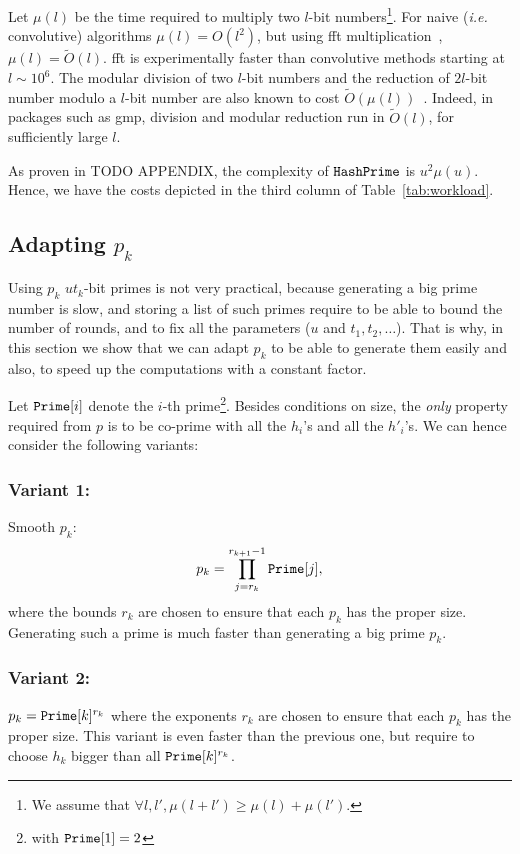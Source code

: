\documentclass[11pt]{llncs}
\newcommand{\Oapp}{\ensuremath{\tilde{O}}}
\begin{document}
Let $\mu(l)$ be the time required to multiply two $l$-bit numbers\footnote{We assume that $\forall l,l', \mu(l+l') \ge \mu(l) + \mu(l')$.}.
For naive ({\sl i.e.} convolutive) algorithms $\mu(l) = O(l^2)$, but using {\sc fft} multiplication~\cite{schonhage1971schnelle}, $\mu(l) = \Oapp(l)$. {\sc fft} is experimentally faster than convolutive methods starting at $l \sim 10^6$.
The modular division of two $l$-bit numbers and the reduction of $2l$-bit number modulo a $l$-bit number are also known to cost $\Oapp(\mu(l))$~\cite{burnikel1998fast}.
Indeed, in packages such as {\sf gmp}, division and modular reduction run in $\Oapp(l)$, for sufficiently large $l$.\smallskip

As proven in TODO APPENDIX, the complexity of $\tt HashPrime$ is $u^2 \mu(u)$.
Hence, we have the costs depicted in the third column of Table~\ref{tab:workload}.



\subsection{Adapting $p_k$}

Using $p_k$ $ut_k$-bit primes is not very practical, because generating a big prime number is slow, and storing a list of such primes require to be able to bound the number of rounds, and to fix all the parameters ($u$ and $t_1,t_2,\dots$).
That is why, in this section we show that we can adapt $p_k$ to be able to generate them easily and also, to speed up the computations with a constant factor.

Let $\mbox{{\tt Prime}}[i]$ denote the $i$-th prime\footnote{with $\mbox{{\tt Prime}}[1]=2$}. Besides conditions on size, the {\sl only} property required from $p$ is to be co-prime with all the $h_i$'s and all the $h'_i$'s. We can hence consider the following variants:
\subsubsection{Variant 1:} Smooth $p_k$:
\[ p_k=\prod_{j=r_k}^{r_{k+1}-1} \mbox{{\tt Prime}}[j], \]
where the bounds $r_k$ are chosen to ensure that each $p_k$ has the proper size.
Generating such a prime is much faster than generating a big prime $p_k$.

\subsubsection{Variant 2:} $p_k=\mbox{{\tt Prime}}[k]^{r_k}$ where the exponents $r_k$ are chosen to ensure that each $p_k$ has the proper size.
This variant is even faster than the previous one, but require to choose $h_k$ bigger than all
$\mbox{{\tt Prime}}[k]^{r_k}$. 
\end{document}
